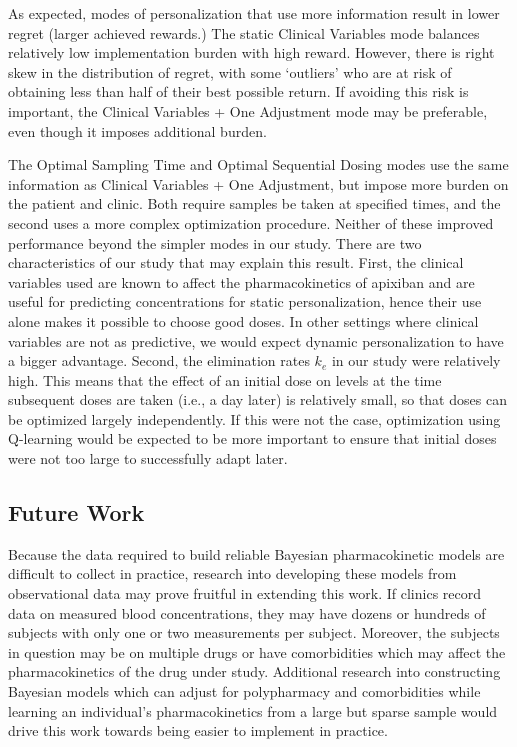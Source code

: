 
As expected, modes of personalization that use more information result in lower regret (larger achieved rewards.)  The static Clinical Variables mode balances relatively low implementation burden with high reward. However, there is right skew in the distribution of regret, with some `outliers' who are at risk of obtaining less than half of their best possible return. If avoiding this risk is important, the Clinical Variables + One Adjustment mode may be preferable, even though it imposes additional burden. 

The Optimal Sampling Time and Optimal Sequential Dosing modes use the same information as Clinical Variables + One Adjustment, but impose more burden on the patient and clinic. Both require samples be taken at specified times, and the second uses a more complex optimization procedure. Neither of these improved performance beyond the simpler modes in our study. There are two characteristics of our study that may explain this result. First, the clinical variables used are known to affect the pharmacokinetics of apixiban and are useful for predicting concentrations for static personalization, hence their use alone makes it possible to choose good doses. In other settings where clinical variables are not as predictive, we would expect dynamic personalization to have a bigger advantage. Second, the elimination rates $k_e$ in our study were relatively high. This means that the effect of an initial dose on levels at the time subsequent doses are taken (i.e., a day later) is relatively small, so that doses can be optimized largely independently. If this were not the case, optimization using Q-learning would be expected to be more important to ensure that initial doses were not too large to successfully adapt later.

\subsection{Future Work}

Because the data required to build reliable Bayesian pharmacokinetic models are difficult to collect in practice, research into developing these models from observational data may prove fruitful in extending this work. If clinics record data on measured blood concentrations, they may have dozens or hundreds of subjects with only one or two measurements per subject.  Moreover, the subjects in question may be on multiple drugs or have comorbidities which may affect the pharmacokinetics of the drug under study.  Additional research into constructing Bayesian models which can adjust for polypharmacy and comorbidities while learning an individual’s pharmacokinetics from a large but sparse sample would drive this work towards being easier to implement in practice.


